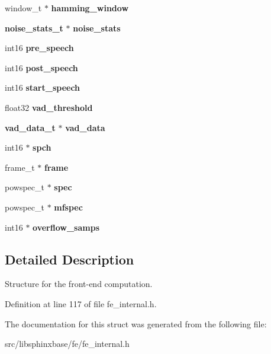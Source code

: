 \begin{DoxyCompactItemize}
\item 
window\-\_\-t $\ast$ {\bfseries hamming\-\_\-window}\label{structfe__s_ad47433337a370e452070ffddce87e474}

\item 
{\bf noise\-\_\-stats\-\_\-t} $\ast$ {\bfseries noise\-\_\-stats}\label{structfe__s_a6b1303b8c74a676ca9dcc9adc07033e9}

\item 
int16 {\bfseries pre\-\_\-speech}\label{structfe__s_a2bcaff6bbc8ee6e990a7092bd0d22771}

\item 
int16 {\bfseries post\-\_\-speech}\label{structfe__s_a46c8eab758b1a737ccc5ef4654e42f6c}

\item 
int16 {\bfseries start\-\_\-speech}\label{structfe__s_a93290323d05eb26e0dfe423a9b27063a}

\item 
float32 {\bfseries vad\-\_\-threshold}\label{structfe__s_a8c484564cca88e8aec167fe94bd27891}

\item 
{\bf vad\-\_\-data\-\_\-t} $\ast$ {\bfseries vad\-\_\-data}\label{structfe__s_aaae66e5327a74c4270c8f0decd4d4389}

\item 
int16 $\ast$ {\bfseries spch}\label{structfe__s_a7d49693c1fa1b14bbcd25b87ad97935b}

\item 
frame\-\_\-t $\ast$ {\bfseries frame}\label{structfe__s_a6fe89784eb5d23ee812439f427d33fe6}

\item 
powspec\-\_\-t $\ast$ {\bfseries spec}\label{structfe__s_af455b0ee3f8d81ca84ac88d4ea04e860}

\item 
powspec\-\_\-t $\ast$ {\bfseries mfspec}\label{structfe__s_a87fd448109884fc3d796b926b67697e7}

\item 
int16 $\ast$ {\bfseries overflow\-\_\-samps}\label{structfe__s_a7975216c6a540fa498352736404797b1}

\end{DoxyCompactItemize}


\subsection{Detailed Description}
Structure for the front-\/end computation. 



Definition at line 117 of file fe\-\_\-internal.\-h.



The documentation for this struct was generated from the following file\-:\begin{DoxyCompactItemize}
\item 
src/libsphinxbase/fe/fe\-\_\-internal.\-h\end{DoxyCompactItemize}
